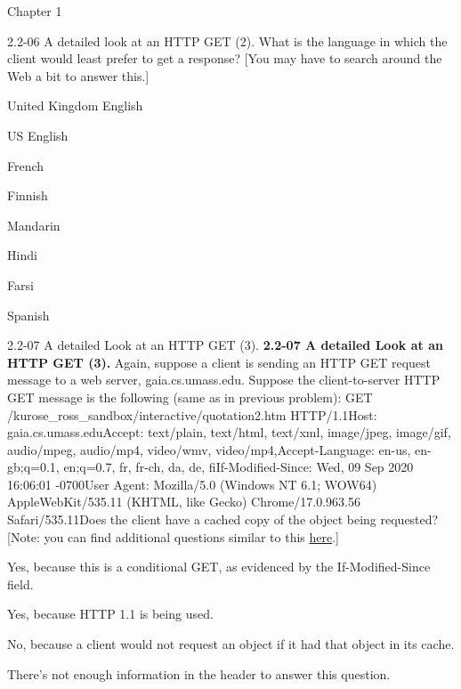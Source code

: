 \documentclass[a4paper]{article}
\begin{document}
\begin{quiz}{Chapter 1}
\begin{multi}[points=1,shuffle]{2.2-06 A detailed look at an HTTP GET (2).}
What is the language in which the client would least prefer to get a response?  
[You may have to search around the Web a bit to answer this.] 

\item* United Kingdom English
\item US English
\item French
\item Finnish
\item Mandarin
\item Hindi
\item Farsi
\item Spanish
\end{multi}

\begin{multi}[points=1,shuffle]{2.2-07 A detailed Look at an HTTP GET (3).}
 \textbf{2.2-07 A detailed Look at an HTTP GET (3).} Again, suppose a client is sending an HTTP GET request message to a web server, gaia.cs.umass.edu. Suppose the client-to-server HTTP GET message is the following (same as in previous problem): GET /kurose_ross_sandbox/interactive/quotation2.htm HTTP/1.1Host: gaia.cs.umass.eduAccept: text/plain, text/html, text/xml, image/jpeg, image/gif, audio/mpeg, audio/mp4, video/wmv, video/mp4,Accept-Language: en-us, en-gb;q=0.1, en;q=0.7, fr, fr-ch, da, de, fiIf-Modified-Since: Wed, 09 Sep 2020 16:06:01 -0700User Agent: Mozilla/5.0 (Windows NT 6.1; WOW64) AppleWebKit/535.11 (KHTML, like Gecko) Chrome/17.0.963.56 Safari/535.11Does the client have a cached copy of the object being requested? [Note: you can find additional questions similar to this \href{http://gaia.cs.umass.edu/kurose_ross/interactive/http-get.php}{here}.] 
\item* Yes, because this is a conditional GET, as evidenced by the If-Modified-Since field.
\item Yes, because HTTP 1.1 is being used.
\item No, because a client would not request an object if it had that object in its cache.
\item There's not enough information in the header to answer this question.
\end{multi}


\end{quiz}
\end{document}
